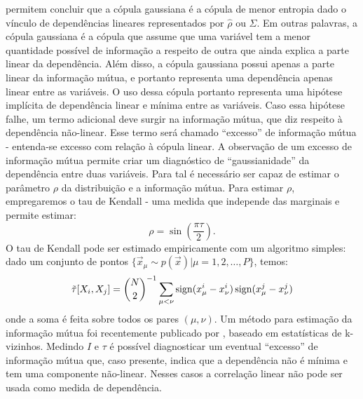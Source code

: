 permitem concluir que a cópula gaussiana é a cópula de menor entropia dado o vínculo de dependências lineares representados por $\hat{\rho}$ ou $\Sigma$. Em outras palavras, a cópula gaussiana é a cópula que assume que uma variável tem a menor quantidade possível de informação a respeito de outra que ainda explica a parte linear da dependência. Além disso, a cópula gaussiana possui apenas a parte linear da informação mútua, e portanto representa uma dependência apenas linear entre as variáveis. O uso dessa cópula portanto representa uma hipótese implícita de dependência linear e mínima entre as variáveis. Caso essa hipótese falhe, um termo adicional deve surgir na informação mútua, que diz respeito à dependência não-linear. Esse termo será chamado ``excesso'' de informação mútua - entenda-se excesso com relação à cópula linear. A observação de um excesso de informação mútua permite criar um diagnóstico de ``gaussianidade'' da dependência entre duas variáveis. Para tal é necessário ser capaz de estimar o parâmetro $\rho$ da distribuição e a informação mútua. Para estimar $\rho$, empregaremos o tau de Kendall - uma medida que independe das marginais e permite estimar:
\begin{equation}
 \rho = \sin\left(\frac{\pi\tau}{2}\right).
\end{equation}
O tau de Kendall pode ser estimado empiricamente com um algoritmo simples: dado um conjunto de pontos $\{\vec{x}_\mu \sim p(\vec{x}) | \mu = 1,2,\ldots,P\}$, temos:
\begin{equation}
\label{eq:kendall}
\tilde{\tau}[X_i,X_j] = \binom{N}{2}^{-1} \sum_{\mu < \nu} \sign(x_\mu^i - x_\nu^i)\sign(x_\mu^j - x_\nu^j)
\end{equation}
onde a soma é feita sobre todos os pares $(\mu,\nu)$. Um método para estimação da informação mútua foi recentemente publicado por \citet{Kraskov2004}, baseado em estatísticas de k-vizinhos. Medindo $I$ e $\tau$ é possível diagnosticar um eventual ``excesso'' de informação mútua que, caso presente, indica que a dependência não é mínima e tem uma componente não-linear. Nesses casos a correlação linear não pode ser usada como medida de dependência. 
